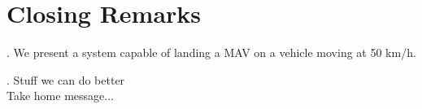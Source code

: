 \section{Closing Remarks}

\begin{frame}{\thesection. \insertsection}
	We present a system capable of landing a MAV on a vehicle moving at 50 km/h.
\end{frame}


\begin{frame}{\thesection. \insertsection}
	Stuff we can do better\\
	
	Take home message...
\end{frame}